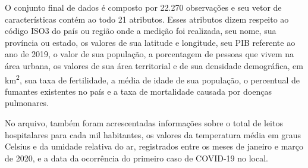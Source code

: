 \documentclass{ieeeaccess}
\begin{document}
O conjunto final de dados é composto por 22.270 observações e seu vetor de características contém ao todo 21 atributos. Esses atributos dizem respeito ao código ISO3 do país ou região onde a medição foi realizada, seu nome, sua província ou estado, os valores de sua latitude e longitude, seu PIB referente ao ano de 2019, o valor de sua população, a porcentagem de pessoas que vivem na área urbana, os valores de sua área territorial e de sua densidade demográfica, em km\textsuperscript{2}, sua taxa de fertilidade, a média de idade de sua população, o percentual de fumantes existentes no país e a taxa de mortalidade causada por doenças pulmonares. 

No arquivo, também foram acrescentadas informações sobre o total de leitos hospitalares para cada mil habitantes, os valores da temperatura média em graus Celsius e da umidade relativa do ar, registrados entre os meses de janeiro e março de 2020, e  a data da ocorrência do primeiro caso de COVID-19 no local. 
\end{document}
